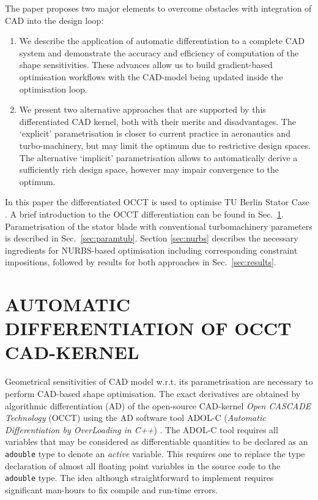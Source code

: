 \documentclass[9pt,academicons]{article}
\begin{document}

The paper proposes two major elements to overcome obstacles with
integration of CAD into the design loop: 
\begin{enumerate}[label=\alph*)]
\item We describe the application of automatic differentiation to a complete CAD
system and demonstrate the accuracy and efficiency of computation of the shape
sensitivities. These advances allow us to build gradient-based optimisation
workflows with the CAD-model being updated inside the optimisation loop. 
\item We present two alternative approaches that are supported by this
differentiated CAD kernel, both with their merits and disadvantages. The `explicit' parametrisation is closer to current practice in aeronautics
and turbo-machinery, but may limit the optimum due to restrictive design spaces.
The alternative `implicit' parametrisation allows to automatically derive a
sufficiently rich design space, however may impair convergence to the optimum.
\end{enumerate}

In this paper the differentiated OCCT is used to optimise TU Berlin Stator Case \cite{tubwebsite}. 
A brief introduction to the OCCT differentiation can be found in Sec.~\ref{sec:occtdifferentiation}. Parametrisation of the stator blade with conventional turbomachinery parameters is described in Sec.~\ref{sec:paramtub}. Section \ref{sec:nurbs} describes the necessary ingredients for NURBS-based optimisation including corresponding constraint impositions, followed by results for both approaches in Sec.~\ref{sec:results}.  


\section{AUTOMATIC DIFFERENTIATION OF OCCT CAD-KERNEL}
\label{sec:occtdifferentiation}
Geometrical sensitivities of CAD model w.r.t. its parametrisation are necessary to perform CAD-based shape optimisation. The exact derivatives are obtained by algorithmic differentiation (AD) of the open-source CAD-kernel \textit{Open CASCADE Technology} (OCCT) using the AD software tool ADOL-C (\textit{Automatic Differentiation by OverLoading in C++}) \cite{banovic17oms}. The ADOL-C tool requires all variables that may be considered as differentiable quantities to be declared as an \texttt{adouble} type to denote an \textit{active} variable. This requires one to replace the type declaration of almost all floating point variables in the source code to the \texttt{adouble} type. The idea although straightforward to implement requires significant man-hours to fix compile and run-time errors.
\end{document}
